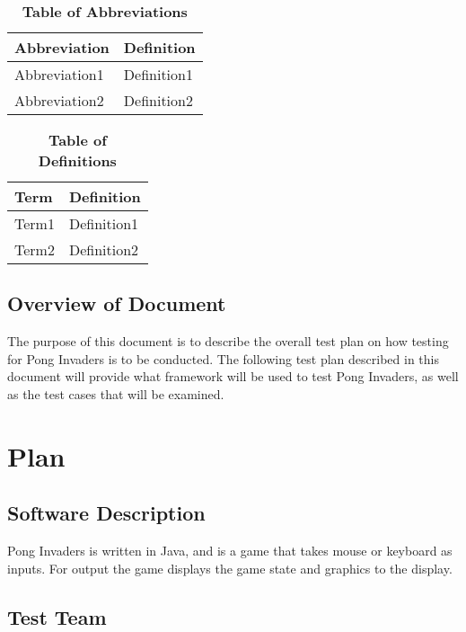 \documentclass[12pt, titlepage]{article}
\begin{document}
\begin{table}[hbp]
\caption{\textbf{Table of Abbreviations}} \label{Table}

\begin{tabularx}{\textwidth}{p{3cm}X}
\toprule
\textbf{Abbreviation} & \textbf{Definition} \\
\midrule
Abbreviation1 & Definition1\\
Abbreviation2 & Definition2\\
\bottomrule
\end{tabularx}

\end{table}

\begin{table}[!htbp]
\caption{\textbf{Table of Definitions}} \label{Table}

\begin{tabularx}{\textwidth}{p{3cm}X}
\toprule
\textbf{Term} & \textbf{Definition}\\
\midrule
Term1 & Definition1\\
Term2 & Definition2\\
\bottomrule
\end{tabularx}

\end{table}	

\subsection{Overview of Document}
The purpose of this document is to describe the overall test plan on
how testing for Pong Invaders is to be conducted. The following test plan
described in this document will provide what framework will be used to test
Pong Invaders, as well as the test cases that will be examined.

\section{Plan}
	
\subsection{Software Description}
Pong Invaders is written in Java, and is a game that takes mouse or keyboard as inputs. For output the game displays the game state and graphics to the display.

\subsection{Test Team}
\end{document}
